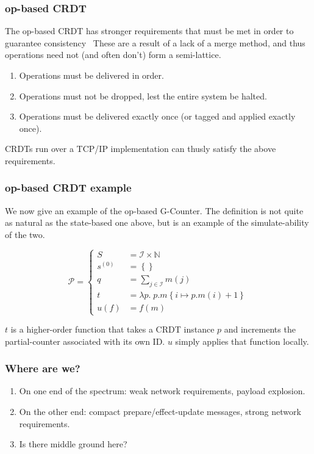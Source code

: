 \documentclass[aspectratio=169,compress]{beamer}
\begin{document}
  \begin{frame}
    \frametitle{op-based CRDT}

    The op-based CRDT has stronger requirements that must be met in order to
    guarantee consistency~\citep{shapiro11} These are a result of a lack of a
    merge method, and thus operations need not (and often don't) form a
    semi-lattice.

    \begin{enumerate}
      \item Operations must be delivered in order.
      \item Operations must not be dropped, lest the entire system be halted.
      \item Operations must be delivered exactly once (or tagged and applied
        exactly once).
    \end{enumerate}

    CRDTs run over a TCP/IP implementation can thusly satisfy the above
    requirements.
  \end{frame}

  \begin{frame}
    \frametitle{op-based CRDT example}

    We now give an example of the op-based G-Counter. The definition is not
    quite as natural as the state-based one above, but is an example of the
    simulate-ability of the two.

    \[
      \mathcal{P} = \left\{\begin{aligned}
        S &= \mathcal{I} \times \mathbb{N} \\
        s^{(0)} &= \left\{ \right\} \\
        q &= \sum_{j \in \mathcal{I}} m(j) \\
        t &= \lambda p.\; p.m\left\{i \mapsto p.m(i) + 1 \right\} \\
        u(f) &= f(m)
      \end{aligned}\right.
    \]

    $t$ is a higher-order function that takes a CRDT instance $p$ and increments
    the partial-counter associated with its own ID. $u$ simply applies that
    function locally.
  \end{frame}

  \begin{frame}
    \frametitle{Where are we?}

    \begin{enumerate}[<+->]
      \item On one end of the spectrum: weak network requirements, payload
        explosion.
      \item On the other end: compact prepare/effect-update messages, strong
        network requirements.
      \item Is there middle ground here?
    \end{enumerate}
  \end{frame}
\end{document}
